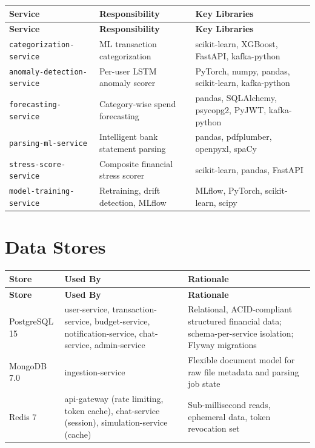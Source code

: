 \documentclass[12pt,a4paper]{report}
\begin{document}
\begin{longtable}{p{4.2cm} p{4.8cm} p{5cm}}
\toprule
\textbf{Service} & \textbf{Responsibility} & \textbf{Key Libraries} \\
\midrule
\endfirsthead
\toprule
\textbf{Service} & \textbf{Responsibility} & \textbf{Key Libraries} \\
\midrule
\endhead
\bottomrule
\endlastfoot
\texttt{categorization-service} & ML transaction categorization & scikit-learn, XGBoost, FastAPI, kafka-python \\[3pt]
\texttt{anomaly-detection-service} & Per-user LSTM anomaly scorer & PyTorch, numpy, pandas, scikit-learn, kafka-python \\[3pt]
\texttt{forecasting-service} & Category-wise spend forecasting & pandas, SQLAlchemy, psycopg2, PyJWT, kafka-python \\[3pt]
\texttt{parsing-ml-service} & Intelligent bank statement parsing & pandas, pdfplumber, openpyxl, spaCy \\[3pt]
\texttt{stress-score-service} & Composite financial stress scorer & scikit-learn, pandas, FastAPI \\[3pt]
\texttt{model-training-service} & Retraining, drift detection, MLflow & MLflow, PyTorch, scikit-learn, scipy \\[3pt]
\end{longtable}

\section{Data Stores}

\begin{longtable}{p{2.5cm} p{4.5cm} p{7cm}}
\toprule
\textbf{Store} & \textbf{Used By} & \textbf{Rationale} \\
\midrule
\endfirsthead
\toprule
\textbf{Store} & \textbf{Used By} & \textbf{Rationale} \\
\midrule
\endhead
\bottomrule
\endlastfoot
PostgreSQL 15 & user-service, transaction-service, budget-service, notification-service, chat-service, admin-service & Relational, ACID-compliant structured financial data; schema-per-service isolation; Flyway migrations \\[3pt]
MongoDB 7.0 & ingestion-service & Flexible document model for raw file metadata and parsing job state \\[3pt]
Redis 7 & api-gateway (rate limiting, token cache), chat-service (session), simulation-service (cache) & Sub-millisecond reads, ephemeral data, token revocation set \\[3pt]
\end{longtable}
\end{document}
